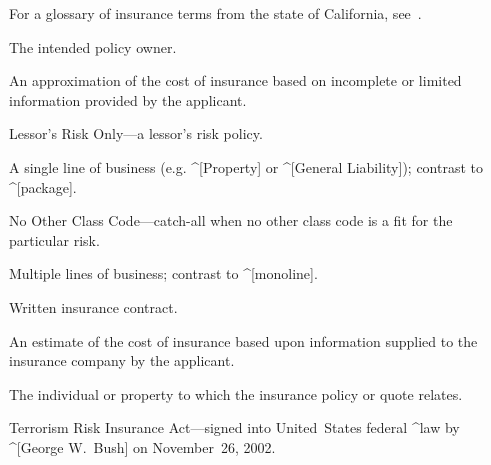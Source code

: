 %
%


For a glossary of insurance terms from the state of California,
see~\cite{gls-ins-calif}.

\begin{description}
  The intended policy owner.

  An approximation of the cost of insurance based on incomplete or limited
  information provided by the applicant.

  Lessor's Risk Only---a lessor's risk policy.

  A single line of business (e.g. ^[Property] or ^[General Liability]); contrast
  to ^[package].

  No Other Class Code---catch-all when no other class code is a fit for the
  particular risk.

  Multiple lines of business; contrast to ^[monoline].

  Written insurance contract.

  An estimate of the cost of insurance based upon information supplied to the
  insurance company by the applicant.

  The individual or property to which the insurance policy or quote relates.

  Terrorism Risk Insurance Act---signed into United~States federal ^law by
  ^[George W.~Bush] on November~26, 2002.
\end{description}

\enddeptgroup
